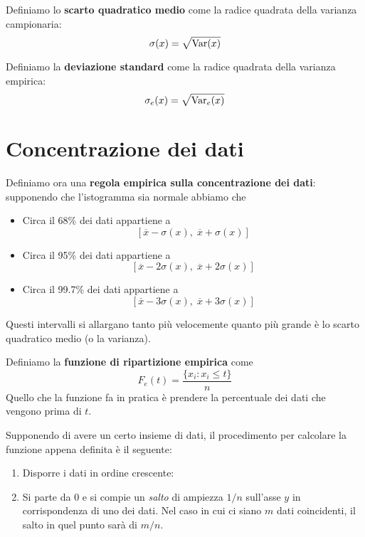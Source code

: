 \begin{definition}
	Definiamo lo \textbf{scarto quadratico medio} come la radice quadrata della varianza
	campionaria:
	\[ \sigma (x) = \sqrt{\operatorname{Var} (x)} \]
\end{definition}

\begin{definition}
	Definiamo la \textbf{deviazione standard} come la radice quadrata della varianza empirica:
	\[ \sigma_e (x) = \sqrt{\operatorname{Var}_e (x)} \]
\end{definition}

\section{Concentrazione dei dati}

\begin{definition}
	Definiamo ora una \textbf{regola empirica sulla concentrazione dei dati}: supponendo che
	l'istogramma sia normale abbiamo che
	\begin{itemize}
		\item Circa il 68\% dei dati appartiene a
		      \[ [ \overline{x} - \sigma(x),\; \overline{x} + \sigma(x) ] \]
		\item Circa il 95\% dei dati appartiene a
		      \[ [ \overline{x} - 2 \sigma(x),\; \overline{x} + 2 \sigma(x) ] \]
		\item Circa il 99.7\% dei dati appartiene a
		      \[ [ \overline{x} - 3 \sigma(x),\; \overline{x} + 3 \sigma(x) ] \]
	\end{itemize}
	Questi intervalli si allargano tanto più velocemente quanto più grande è lo scarto quadratico
	medio (o la varianza).
\end{definition}

\begin{definition}
	Definiamo la \textbf{funzione di ripartizione empirica} come
	\[ F_e(t) = \frac{\{ x_i : x_i \leq t \}}{n} \]
	Quello che la funzione fa in pratica è prendere la percentuale dei dati che vengono prima di
	$t$.
\end{definition}

Supponendo di avere un certo insieme di dati, il procedimento per calcolare la funzione appena
definita è il seguente:
\begin{enumerate}
	\item Disporre i dati in ordine crescente:
	\item Si parte da 0 e si compie un \emph{salto} di ampiezza $1 / n$ sull'asse $y$ in
	      corrispondenza di uno dei dati. Nel caso in cui ci siano $m$ dati coincidenti, il salto
	      in quel punto sarà di $m / n$.
\end{enumerate}

